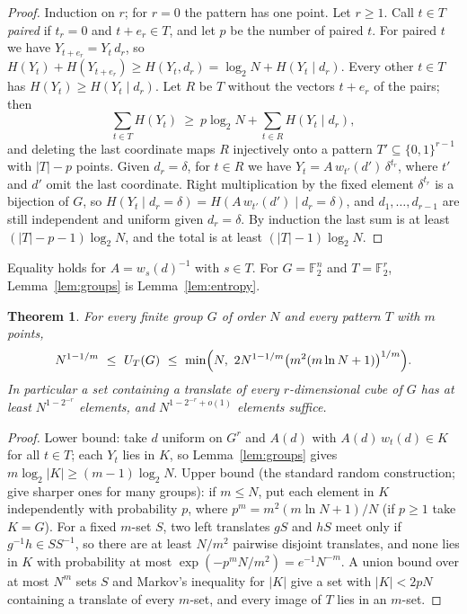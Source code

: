 \documentclass[11pt]{amsart}
\newtheorem{theorem}{Theorem}
\theoremstyle{remark}
\newcommand{\F}{\mathbb{F}}
\begin{document}
\begin{proof}
Induction on $r$; for $r=0$ the pattern has one point. Let $r\ge1$. Call $t\in T$ \emph{paired} if
$t_r=0$ and $t+e_r\in T$, and let $p$ be the number of paired $t$. For paired $t$ we have
$Y_{t+e_r}=Y_t\,d_r$, so
$H(Y_t)+H(Y_{t+e_r})\ge H(Y_t,d_r)=\log_2N+H(Y_t\mid d_r)$. Every other $t\in T$ has
$H(Y_t)\ge H(Y_t\mid d_r)$. Let $R$ be $T$ without the vectors $t+e_r$ of the pairs; then
\[
  \sum_{t\in T}H(Y_t)\ \ge\ p\log_2N+\sum_{t\in R}H(Y_t\mid d_r),
\]
and deleting the last coordinate maps $R$ injectively onto a pattern $T'\subseteq\{0,1\}^{r-1}$
with $|T|-p$ points. Given $d_r=\delta$, for $t\in R$ we have
$Y_t=A\,w_{t'}(d')\,\delta^{t_r}$, where $t'$ and $d'$ omit the last coordinate. Right
multiplication by the fixed element $\delta^{t_r}$ is a bijection of $G$, so
$H(Y_t\mid d_r=\delta)=H(A\,w_{t'}(d')\mid d_r=\delta)$, and $d_1,\dots,d_{r-1}$ are still
independent and uniform given $d_r=\delta$. By induction the last sum is at least
$(|T|-p-1)\log_2N$, and the total is at least $(|T|-1)\log_2N$.
\end{proof}

Equality holds for $A=w_s(d)^{-1}$ with $s\in T$. For $G=\F_2^n$ and $T=\F_2^r$,
Lemma~\ref{lem:groups} is Lemma~\ref{lem:entropy}.

\begin{theorem}\label{thm:groups}
For every finite group $G$ of order $N$ and every pattern $T$ with $m$ points,
\[
  N^{1-1/m}\ \le\ U_T(G)\ \le\ \min\Bigl(N,\ 2N^{1-1/m}\bigl(m^2(m\ln N+1)\bigr)^{1/m}\Bigr).
\]
In particular a set containing a translate of every $r$-dimensional cube of $G$ has at least
$N^{1-2^{-r}}$ elements, and $N^{1-2^{-r}+o(1)}$ elements suffice.
\end{theorem}

\begin{proof}
Lower bound: take $d$ uniform on $G^r$ and $A(d)$ with $A(d)\,w_t(d)\in K$ for all $t\in T$; each
$Y_t$ lies in $K$, so Lemma~\ref{lem:groups} gives $m\log_2|K|\ge(m-1)\log_2N$. Upper bound (the
standard random construction; \cite{ABS} give sharper ones for many groups): if $m\le N$, put each
element in $K$ independently with probability $p$, where $p^m=m^2(m\ln N+1)/N$ (if $p\ge1$ take
$K=G$). For a fixed $m$-set $S$, two left translates $gS$ and $hS$ meet only if $g^{-1}h\in SS^{-1}$,
so there are at least $N/m^2$ pairwise disjoint translates, and none lies in $K$ with probability at
most $\exp(-p^mN/m^2)=e^{-1}N^{-m}$. A union bound over at most $N^m$ sets $S$ and Markov's
inequality for $|K|$ give a set with $|K|<2pN$ containing a translate of every $m$-set, and every
image of $T$ lies in an $m$-set.
\end{proof}
\end{document}
